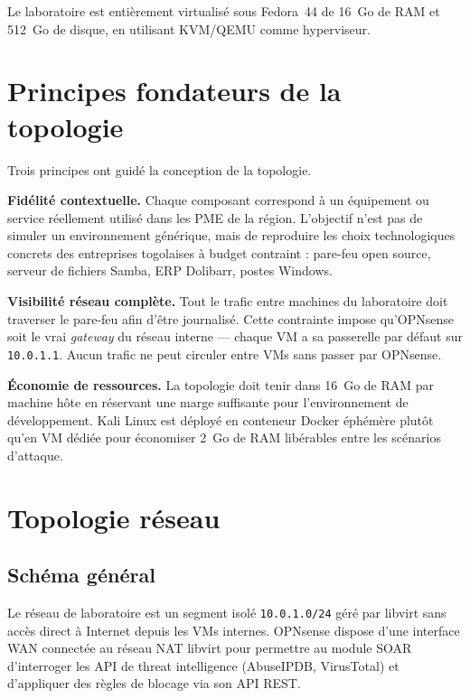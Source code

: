 \documentclass[12pt,a4paper]{article}
\begin{document}
Le laboratoire est entièrement virtualisé sous Fedora~44
de 16~Go de RAM et 512~Go de disque, en
utilisant KVM/QEMU comme hyperviseur.

\section{Principes fondateurs de la topologie}

Trois principes ont guidé la conception de la topologie.

\textbf{Fidélité contextuelle.} Chaque composant correspond à un équipement
ou service réellement utilisé dans les PME de la région. L'objectif n'est
pas de simuler un environnement générique, mais de reproduire les choix
technologiques concrets des entreprises togolaises à budget contraint :
pare-feu open source, serveur de fichiers Samba, ERP Dolibarr, postes
Windows.

\textbf{Visibilité réseau complète.} Tout le trafic entre machines du
laboratoire doit traverser le pare-feu afin d'être journalisé. Cette
contrainte impose qu'OPNsense soit le vrai \textit{gateway} du réseau
interne --- chaque VM a sa passerelle par défaut sur \texttt{10.0.1.1}.
Aucun trafic ne peut circuler entre VMs sans passer par OPNsense.

\textbf{Économie de ressources.} La topologie doit tenir dans 16~Go de RAM
par machine hôte en réservant une marge suffisante pour l'environnement de
développement. Kali Linux est déployé en conteneur Docker éphémère plutôt
qu'en VM dédiée pour économiser 2~Go de RAM libérables entre les scénarios
d'attaque.

\section{Topologie réseau}

\subsection{Schéma général}

Le réseau de laboratoire est un segment isolé \texttt{10.0.1.0/24} géré
par libvirt sans accès direct à Internet depuis les VMs internes. OPNsense
dispose d'une interface WAN connectée au réseau NAT libvirt pour permettre
au module SOAR d'interroger les API de threat intelligence (AbuseIPDB,
VirusTotal) et d'appliquer des règles de blocage via son API REST.
\end{document}
